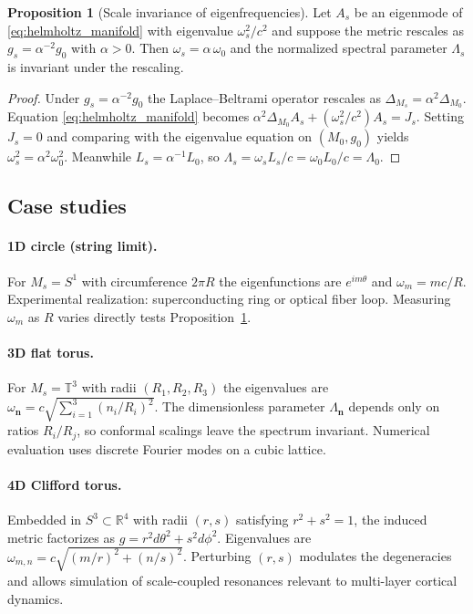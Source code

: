 \documentclass[12pt,a4paper]{article}
\theoremstyle{definition}
\newtheorem{proposition}{Proposition}[section]
\begin{document}
\begin{proposition}[Scale invariance of eigenfrequencies]
\label{prop:scale_invariance_modes}
Let $A_s$ be an eigenmode of \eqref{eq:helmholtz_manifold} with eigenvalue $\omega_s^2/c^2$ and suppose the metric rescales as $g_s = \alpha^{-2} g_0$ with $\alpha > 0$. Then $\omega_s = \alpha \, \omega_0$ and the normalized spectral parameter $\Lambda_s$ is invariant under the rescaling.
\end{proposition}

\begin{proof}
Under $g_s = \alpha^{-2} g_0$ the Laplace--Beltrami operator rescales as $\Delta_{M_s} = \alpha^{2} \Delta_{M_0}$. Equation \eqref{eq:helmholtz_manifold} becomes $\alpha^{2} \Delta_{M_0} A_s + (\omega_s^2/c^2) A_s = J_s$. Setting $J_s = 0$ and comparing with the eigenvalue equation on $(M_0, g_0)$ yields $\omega_s^2 = \alpha^{2} \omega_0^2$. Meanwhile $L_s = \alpha^{-1} L_0$, so $\Lambda_s = \omega_s L_s / c = \omega_0 L_0 / c = \Lambda_0$.
\end{proof}

\subsection{Case studies}

\paragraph{1D circle (string limit).} For $M_s = S^1$ with circumference $2\pi R$ the eigenfunctions are $e^{i m \theta}$ and $\omega_m = m c / R$\cite{GreenSchwarzWitten1987}. Experimental realization: superconducting ring or optical fiber loop. Measuring $\omega_m$ as $R$ varies directly tests Proposition~\ref{prop:scale_invariance_modes}.

\paragraph{3D flat torus.} For $M_s = \mathbb{T}^3$ with radii $(R_1, R_2, R_3)$ the eigenvalues are $\omega_{\mathbf{n}} = c \sqrt{\sum_{i=1}^3 (n_i/R_i)^2}$\cite{Giveon1994}. The dimensionless parameter $\Lambda_{\mathbf{n}}$ depends only on ratios $R_i / R_j$, so conformal scalings leave the spectrum invariant. Numerical evaluation uses discrete Fourier modes on a cubic lattice.

\paragraph{4D Clifford torus.} Embedded in $S^3 \subset \mathbb{R}^4$ with radii $(r,s)$ satisfying $r^2 + s^2 = 1$, the induced metric factorizes as $g = r^2 d\theta^2 + s^2 d\phi^2$\cite{Lawson1970}. Eigenvalues are $\omega_{m,n} = c \sqrt{(m/r)^2 + (n/s)^2}$. Perturbing $(r,s)$ modulates the degeneracies and allows simulation of scale-coupled resonances relevant to multi-layer cortical dynamics.
\end{document}

